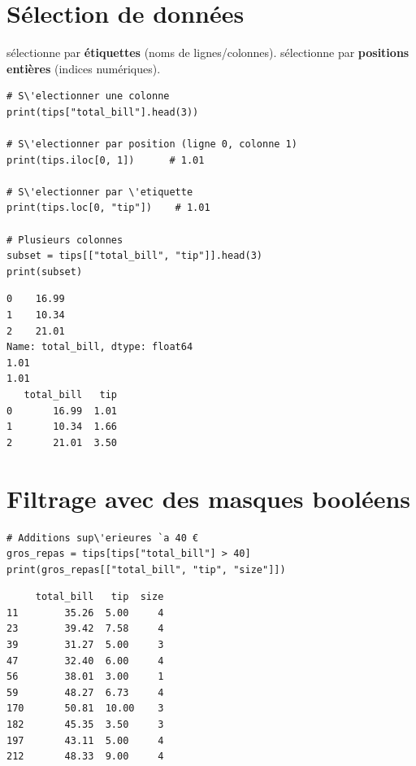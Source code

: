 \section{S\'election de donn\'ees}

\begin{definition}
 s\'electionne par \textbf{\'etiquettes} (noms de lignes/colonnes).
 s\'electionne par \textbf{positions enti\`eres} (indices num\'eriques).
\end{definition}

\begin{codeblock}[title=\textbf{Python}]
\begin{verbatim}
# S\'electionner une colonne
print(tips["total_bill"].head(3))

# S\'electionner par position (ligne 0, colonne 1)
print(tips.iloc[0, 1])      # 1.01

# S\'electionner par \'etiquette
print(tips.loc[0, "tip"])    # 1.01

# Plusieurs colonnes
subset = tips[["total_bill", "tip"]].head(3)
print(subset)
\end{verbatim}
\end{codeblock}

\begin{codeoutput}
\begin{verbatim}
0    16.99
1    10.34
2    21.01
Name: total_bill, dtype: float64
1.01
1.01
   total_bill   tip
0       16.99  1.01
1       10.34  1.66
2       21.01  3.50
\end{verbatim}
\end{codeoutput}

\section{Filtrage avec des masques bool\'eens}

\begin{codeblock}[title=\textbf{Python}]
\begin{verbatim}
# Additions sup\'erieures `a 40 €
gros_repas = tips[tips["total_bill"] > 40]
print(gros_repas[["total_bill", "tip", "size"]])
\end{verbatim}
\end{codeblock}

\begin{codeoutput}
\begin{verbatim}
     total_bill   tip  size
11        35.26  5.00     4
23        39.42  7.58     4
39        31.27  5.00     3
47        32.40  6.00     4
56        38.01  3.00     1
59        48.27  6.73     4
170       50.81  10.00    3
182       45.35  3.50     3
197       43.11  5.00     4
212       48.33  9.00     4
\end{verbatim}
\end{codeoutput}


